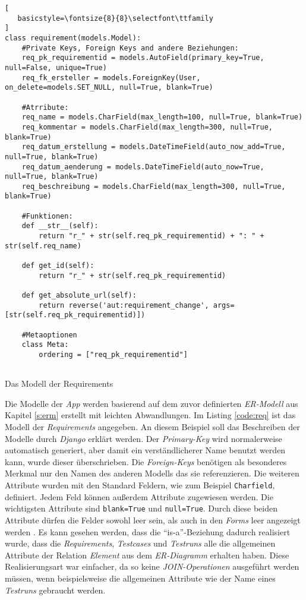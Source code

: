 \documentclass[11pt,a4paper]{report}
\begin{document}
\begin{listing}[htbp]
\begin{lstlisting}[
   basicstyle=\fontsize{8}{8}\selectfont\ttfamily
]
class requirement(models.Model):
    #Private Keys, Foreign Keys and andere Beziehungen:
    req_pk_requirementid = models.AutoField(primary_key=True, null=False, unique=True)
    req_fk_ersteller = models.ForeignKey(User, on_delete=models.SET_NULL, null=True, blank=True)

    #Atrribute:
    req_name = models.CharField(max_length=100, null=True, blank=True)
    req_kommentar = models.CharField(max_length=300, null=True, blank=True)
    req_datum_erstellung = models.DateTimeField(auto_now_add=True, null=True, blank=True)
    req_datum_aenderung = models.DateTimeField(auto_now=True, null=True, blank=True)
    req_beschreibung = models.CharField(max_length=300, null=True, blank=True)

    #Funktionen:
    def __str__(self):
        return "r_" + str(self.req_pk_requirementid) + ": " + str(self.req_name)

    def get_id(self):
        return "r_" + str(self.req_pk_requirementid)

    def get_absolute_url(self):
        return reverse('aut:requirement_change', args=[str(self.req_pk_requirementid)])

    #Metaoptionen
    class Meta:
        ordering = ["req_pk_requirementid"]


\end{lstlisting}
\caption{Das Modell der Requirements}
\label{code:req}
\end{listing}

Die Modelle der \textit{App} werden basierend auf dem zuvor definierten \textit{ER-Modell} aus Kapitel \ref{s:erm} erstellt mit leichten Abwandlungen. Im Listing \ref{code:req} ist das Modell der \textit{Requirements} angegeben. An diesem Beispiel soll das Beschreiben der Modelle durch \textit{Django} erklärt werden. Der \textit{Primary-Key} wird normalerweise automatisch generiert, aber damit ein verständlicherer Name benutzt werden kann, wurde dieser überschrieben. Die \textit{Foreign-Keys} benötigen als besonderes Merkmal nur den Namen des anderen Modells das sie referenzieren. Die weiteren Attribute wurden mit den Standard Feldern, wie zum Beispiel \verb|Charfield|, definiert. Jedem Feld können außerdem Attribute zugewiesen werden. Die wichtigsten Attribute sind \verb|blank=True| und \verb|null=True|. Durch diese beiden Attribute dürfen die Felder sowohl leer sein, als auch in den \textit{Forms} leer angezeigt werden \cite{mozillatuto5}. Es kann gesehen werden, dass die "`is-a"'-Beziehung dadurch realisiert wurde, dass die \textit{Requirements}, \textit{Testcases} und \textit{Testruns} alle die allgemeinen Attribute der Relation \textit{Element} aus dem \textit{ER-Diagramm} erhalten haben. Diese Realisierungsart war einfacher, da so keine \textit{JOIN-Operationen} ausgeführt werden müssen, wenn beispielsweise die allgemeinen Attribute wie der Name eines \textit{Testruns} gebraucht werden.
\end{document}
